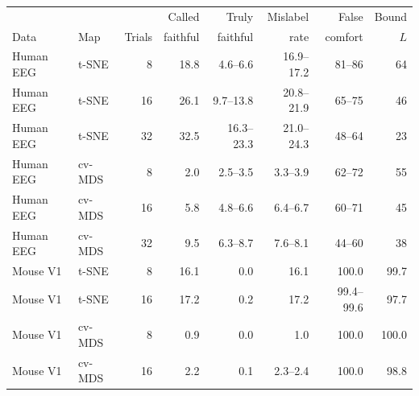 \begin{tabular}{llrrrrrr}
\toprule
 & & & Called & Truly & Mislabel & False & Bound \\
Data & Map & Trials & faithful & faithful & rate & comfort & $L$ \\
\midrule
Human EEG & t-SNE & 8 & 18.8 & 4.6--6.6 & 16.9--17.2 & 81--86 & 64 \\
Human EEG & t-SNE & 16 & 26.1 & 9.7--13.8 & 20.8--21.9 & 65--75 & 46 \\
Human EEG & t-SNE & 32 & 32.5 & 16.3--23.3 & 21.0--24.3 & 48--64 & 23 \\
\addlinespace
Human EEG & cv-MDS & 8 & 2.0 & 2.5--3.5 & 3.3--3.9 & 62--72 & 55 \\
Human EEG & cv-MDS & 16 & 5.8 & 4.8--6.6 & 6.4--6.7 & 60--71 & 45 \\
Human EEG & cv-MDS & 32 & 9.5 & 6.3--8.7 & 7.6--8.1 & 44--60 & 38 \\
\addlinespace
Mouse V1 & t-SNE & 8 & 16.1 & 0.0 & 16.1 & 100.0 & 99.7 \\
Mouse V1 & t-SNE & 16 & 17.2 & 0.2 & 17.2 & 99.4--99.6 & 97.7 \\
\addlinespace
Mouse V1 & cv-MDS & 8 & 0.9 & 0.0 & 1.0 & 100.0 & 100.0 \\
Mouse V1 & cv-MDS & 16 & 2.2 & 0.1 & 2.3--2.4 & 100.0 & 98.8 \\
\bottomrule
\end{tabular}
